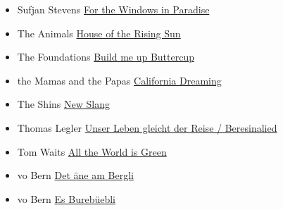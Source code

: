 \documentclass[
]{book}
\begin{document}
\begin{itemize}
\item
  Sufjan Stevens \protect\hyperlink{selected-songs-windows-in-paradise}{For the Windows in Paradise}
\item
  The Animals \protect\hyperlink{classics-house-of-the-rising-sun}{House of the Rising Sun}
\item
  The Foundations \protect\hyperlink{selected-songs-build-me-up-buttercup}{Build me up Buttercup}
\item
  the Mamas and the Papas \protect\hyperlink{classics-calafornia-dreaming}{California Dreaming}
\item
  The Shins \protect\hyperlink{selected-songs-new-slang}{New Slang}
\item
  Thomas Legler \protect\hyperlink{mundart-und-deutsch-beresinalied}{Unser Leben gleicht der Reise / Beresinalied}
\item
  Tom Waits \protect\hyperlink{selected-songs-all-the-world-is-green}{All the World is Green}
\item
  vo Bern \protect\hyperlink{mundart-und-deutsch-det-ane-am-bergli}{Det äne am Bergli}
\item
  vo Bern \protect\hyperlink{volsklieder-es-burebuebli}{Es Burebüebli}
\end{itemize}
\end{document}

